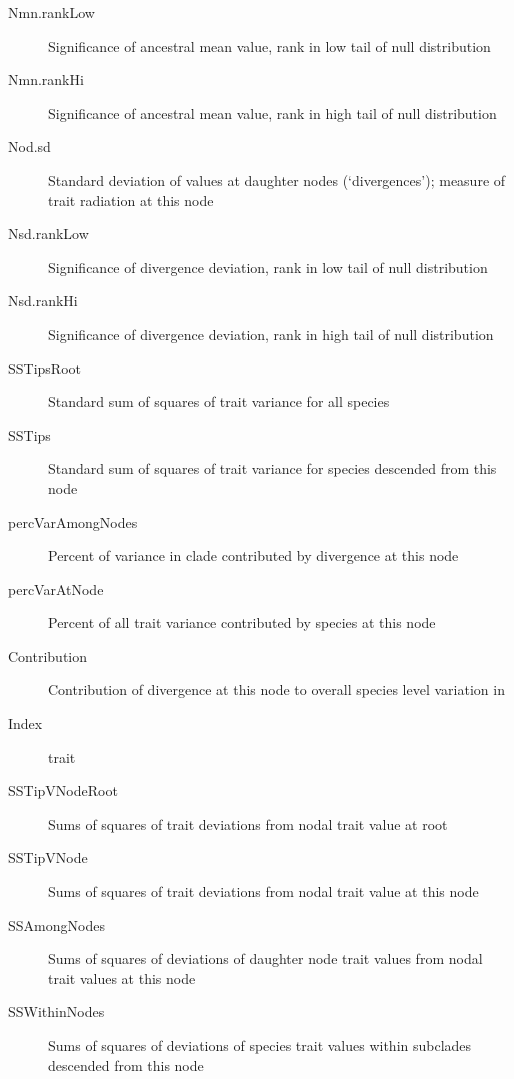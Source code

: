 \documentclass[12pt,letterpaper]{article}
\begin{document}
\begin{description}
\item[\hspace{1em} Nmn.rankLow] Significance of ancestral mean value, rank in low tail of null distribution
\item[\hspace{1em} Nmn.rankHi] Significance of ancestral mean value, rank in high tail of null distribution
\item[\hspace{1em} Nod.sd] Standard deviation of values at daughter nodes (`divergences'); measure of trait radiation at this node
\item[\hspace{1em} Nsd.rankLow] Significance of divergence deviation, rank in low tail of null distribution
\item[\hspace{1em} Nsd.rankHi] Significance of divergence deviation, rank in high tail of null distribution
\item[\hspace{1em} SSTipsRoot] Standard sum of squares of trait variance for all species
\item[\hspace{1em} SSTips] Standard sum of squares of trait variance for species descended from this node
\item[\hspace{1em} percVarAmongNodes] Percent of variance in clade contributed by divergence at this node
\item[\hspace{1em} percVarAtNode] Percent of all trait variance contributed by
  species at this node
\item[\hspace{1em} Contribution] Contribution of divergence at this node to overall
  species level variation in
\item[\hspace{1em} Index] trait \citep[see][]{moles2005briX}
\item[\hspace{1em} SSTipVNodeRoot] Sums of squares of trait deviations from nodal
  trait value at root
\item[\hspace{1em} SSTipVNode] Sums of squares of trait deviations from nodal trait value at this node
\item[\hspace{1em} SSAmongNodes] Sums of squares of deviations of daughter node trait
  values from nodal trait values at this node
\item[\hspace{1em} SSWithinNodes] Sums of squares of deviations of species trait
  values within subclades descended from this node
\end{description}
\end{document}
